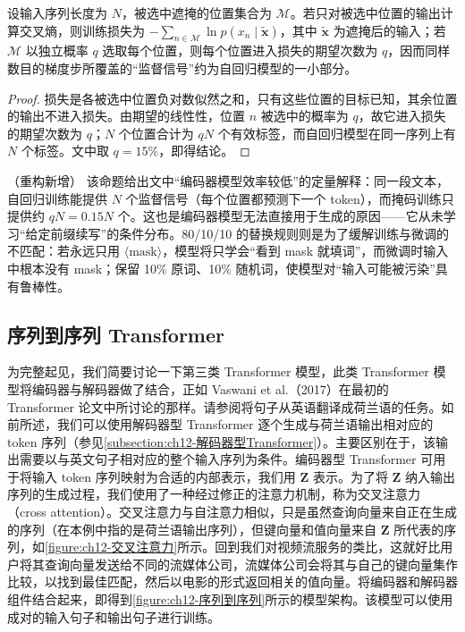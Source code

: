 \documentclass[../../main.tex]{subfiles}
\begin{document}
\begin{proposition}[掩码语言建模的损失覆盖]\label{proposition:ch12-掩码损失}
设输入序列长度为 $N$，被选中遮掩的位置集合为 $\mathcal{M}$。若只对被选中位置的输出计算交叉熵，则训练损失为 $-\sum_{n\in\mathcal{M}}\ln p\left(x_n\mid\tilde{\mathbf{x}}\right)$，其中 $\tilde{\mathbf{x}}$ 为遮掩后的输入；若 $\mathcal{M}$ 以独立概率 $q$ 选取每个位置，则每个位置进入损失的期望次数为 $q$，因而同样数目的梯度步所覆盖的“监督信号”约为自回归模型的一小部分。
\end{proposition}

\begin{proof}
损失是各被选中位置负对数似然之和，只有这些位置的目标已知，其余位置的输出不进入损失。由期望的线性性，位置 $n$ 被选中的概率为 $q$，故它进入损失的期望次数为 $q$；$N$ 个位置合计为 $qN$ 个有效标签，而自回归模型在同一序列上有 $N$ 个标签。文中取 $q=15\%$，即得结论。
\end{proof}

\begin{remark}（重构新增）
该命题给出文中“编码器模型效率较低”的定量解释：同一段文本，自回归训练能提供 $N$ 个监督信号（每个位置都预测下一个 token），而掩码训练只提供约 $qN=0.15N$ 个。这也是编码器模型无法直接用于生成的原因——它从未学习“给定前缀续写”的条件分布。80/10/10 的替换规则则是为了缓解训练与微调的不匹配：若永远只用 $\langle\mathrm{mask}\rangle$，模型将只学会“看到 mask 就填词”，而微调时输入中根本没有 mask；保留 10\% 原词、10\% 随机词，使模型对“输入可能被污染”具有鲁棒性。
\end{remark}

\subsection{序列到序列 Transformer}\label{subsection:ch12-序列到序列Transformer}

为完整起见，我们简要讨论一下第三类 Transformer 模型，此类 Transformer 模型将编码器与解码器做了结合，正如 Vaswani et al.（2017）在最初的 Transformer 论文中所讨论的那样。请参阅将句子从英语翻译成荷兰语的任务。如前所述，我们可以使用解码器型 Transformer 逐个生成与荷兰语输出相对应的 token 序列（参见\cref{subsection:ch12-解码器型Transformer}）。主要区别在于，该输出需要以与英文句子相对应的整个输入序列为条件。编码器型 Transformer 可用于将输入 token 序列映射为合适的内部表示，我们用 $\mathbf{Z}$ 表示。为了将 $\mathbf{Z}$ 纳入输出序列的生成过程，我们使用了一种经过修正的注意力机制，称为交叉注意力（cross attention）。交叉注意力与自注意力相似，只是虽然查询向量来自正在生成的序列（在本例中指的是荷兰语输出序列），但键向量和值向量来自 $\mathbf{Z}$ 所代表的序列，如\cref{figure:ch12-交叉注意力}所示。回到我们对视频流服务的类比，这就好比用户将其查询向量发送给不同的流媒体公司，流媒体公司会将其与自己的键向量集作比较，以找到最佳匹配，然后以电影的形式返回相关的值向量。将编码器和解码器组件结合起来，即得到\cref{figure:ch12-序列到序列}所示的模型架构。该模型可以使用成对的输入句子和输出句子进行训练。
\end{document}
